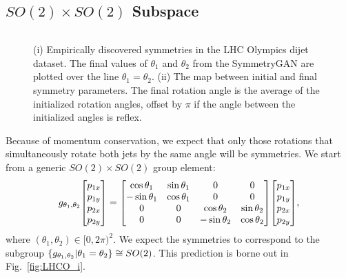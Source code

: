 \documentclass[aps,prx,reprint,preprintnumbers,superscriptaddress,nofootinbib,longbibliography,floatfix]{revtex4-1}
\DeclareRobustCommand{\Fig}[1]{Fig.~\ref{fig:#1}}
\begin{document}
\subsection{$SO(2) \times SO(2)$ Subspace}


\begin{figure*}[p]
    \centering
    $\quad$
    \caption{
    (i) Empirically discovered symmetries in the LHC Olympics dijet dataset.
    The final values of $\theta_1$ and $\theta_2$ from the SymmetryGAN are plotted over the line $\theta_1 = \theta_2$.
    (ii) The map between initial and final symmetry parameters.
    The final rotation angle is the average of the initialized rotation angles, offset by $\pi$ if the angle between the initialized angles is reflex. 
    }
    \label{fig:LHCO}
\end{figure*}  

Because of momentum conservation, we expect that only those rotations that simultaneously rotate both jets by the same angle will be symmetries.
%
We start from a generic $SO(2)\times SO(2)$ group element:
%
\begin{equation}
    g_{\theta_1, \theta_2}\mqty[p_{1x}\\ p_{1y}\\p_{2x}\\p_{2y}] = \mqty[\cos\theta_1&\sin\theta_1&0&0\\-\sin\theta_1&\cos\theta_1&0&0\\0&0&\cos\theta_2&\sin\theta_2\\0&0&-\sin\theta_2&\cos\theta_2]\mqty[p_{1x}\\ p_{1y}\\p_{2x}\\p_{2y}],
\end{equation}
%
where $(\theta_1, \theta_2) \in [0, 2\pi)^2$.
%
We expect the symmetries to correspond to the subgroup $\qty{g_{\theta_1, \theta_2}|\theta_1 = \theta_2}\cong SO(2)$.
%
This prediction is borne out in \Fig{LHCO_i}.
\end{document}
